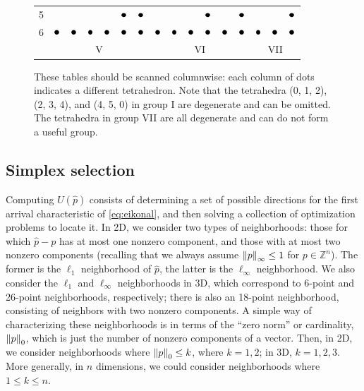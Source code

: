 \documentclass[eikonal.tex]{subfiles}
\begin{document}
\begin{figure}[t]
{\begin{tabular}{c|cccccc|cccccc|ccc}
      5 & & & & & $\groupmarker$ & $\groupmarker$ & & & & $\groupmarker$ & & $\groupmarker$ & & & $\groupmarker$ \\
      6 & $\groupmarker$ & $\groupmarker$ & $\groupmarker$ & $\groupmarker$ & $\groupmarker$ & $\groupmarker$ & $\groupmarker$ & $\groupmarker$ & $\groupmarker$ & $\groupmarker$ & $\groupmarker$ & $\groupmarker$ & $\groupmarker$ & $\groupmarker$ & $\groupmarker$ \\
      \multicolumn{1}{c}{} & \multicolumn{6}{c}{V} & \multicolumn{6}{c}{VI} & \multicolumn{3}{c}{VII}
    \end{tabular}%
    \vspace{-0.5em}
  }
  \caption{These tables should be scanned columnwise: each column of
    dots indicates a different tetrahedron. Note that the tetrahedra
    (0, 1, 2), (2, 3, 4), and (4, 5, 0) in group I are degenerate and
    can be omitted. The tetrahedra in group VII are all degenerate and
    can do not form a useful group.}\label{fig:tetrahedra-groups}
  \vspace{1em}
\end{figure}

\subsection{Simplex selection}

Computing $U(\hat{p})$ consists of determining a set of possible
directions for the first arrival characteristic of \cref{eq:eikonal},
and then solving a collection of optimization problems to locate
it. In 2D, we consider two types of neighborhoods: those for which
$\hat{p} - p$ has at most one nonzero component, and those with at
most two nonzero components (recalling that we always assume
$\left\|p\right\|_\infty \leq 1$ for $p \in \mathbb{Z}^n$). The former is the
$\ell_1$ neighborhood of $\hat{p}$, the latter is the $\ell_\infty$
neighborhood. We also consider the $\ell_1$ and $\ell_\infty$
neighborhoods in 3D, which correspond to 6-point and 26-point
neighborhoods, respectively; there is also an 18-point neighborhood,
consisting of neighbors with two nonzero components. A simple way of
characterizing these neighborhoods is in terms of the ``zero norm'' or
cardinality, $\left\|p\right\|_0$, which is just the number of nonzero
components of a vector. Then, in 2D, we consider neighborhoods where
$\left\|p\right\|_0 \leq k$, where $k = 1, 2$; in 3D, $k = 1, 2, 3$. More
generally, in $n$ dimensions, we could consider neighborhoods where
$1 \leq k \leq n$.
\end{document}
